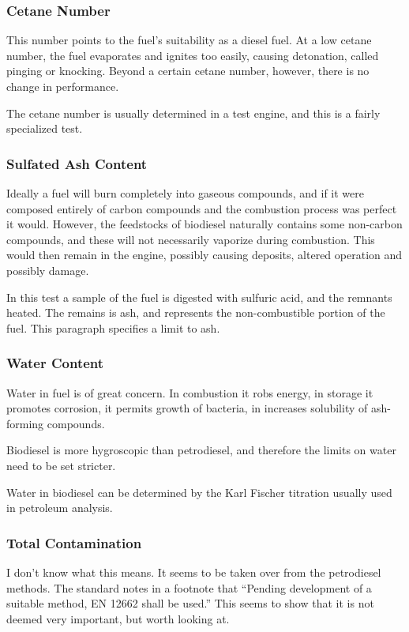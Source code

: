 \subsubsection{Cetane Number}

This number points to the fuel's suitability as a diesel fuel. At a low cetane number, the fuel evaporates and ignites too easily, causing detonation, called pinging or knocking. Beyond a certain cetane number, however, there is no change in performance.

The cetane number is usually determined in a test engine, and this is a fairly specialized test.

\subsubsection{Sulfated Ash Content}

Ideally a fuel will burn completely into gaseous compounds, and if it were composed entirely of carbon compounds and the combustion process was perfect it would. However, the feedstocks of biodiesel naturally contains some non-carbon compounds, and these will not necessarily vaporize during combustion. This would then remain in the engine, possibly causing deposits, altered operation and possibly damage.

In this test a sample of the fuel is digested with sulfuric acid, and the remnants heated. The remains is ash, and represents the non-combustible portion of the fuel. This paragraph specifies a limit to ash.

\subsubsection{Water Content}

Water in fuel is of great concern. In combustion it robs energy, in storage it promotes corrosion, it permits growth of bacteria, in increases solubility of ash-forming compounds.

Biodiesel is more hygroscopic than petrodiesel, and therefore the limits on water need to be set stricter.

Water in biodiesel can be determined by the Karl Fischer titration usually used in petroleum analysis.

\subsubsection{Total Contamination}

I don't know what this means. It seems to be taken over from the petrodiesel methods. The standard notes in a footnote that ``Pending development of a suitable method, EN 12662 shall be used.'' This seems to show that it is not deemed very important, but worth looking at.

